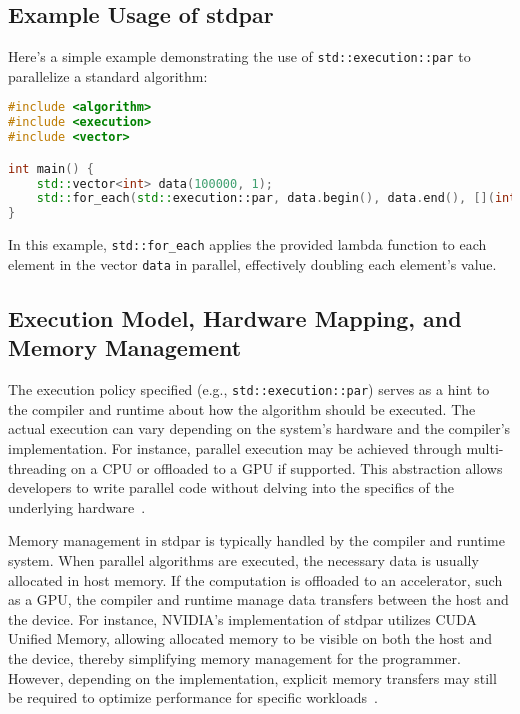 \subsection{Example Usage of stdpar}

Here's a simple example demonstrating the use of \texttt{std::execution::par} to parallelize a standard
algorithm:

\begin{lstlisting}[language=C++, caption={Parallel execution using \texttt{std::execution::par}}]
#include <algorithm>
#include <execution>
#include <vector>

int main() {
    std::vector<int> data(100000, 1);
    std::for_each(std::execution::par, data.begin(), data.end(), [](int& x) { x *= 2; });
}
\end{lstlisting}

In this example, \texttt{std::for\_each} applies the provided lambda function to each element in the vector
\texttt{data} in parallel, effectively doubling each element's value.

\subsection{Execution Model, Hardware Mapping, and Memory Management}

The execution policy specified (e.g., \texttt{std::execution::par}) serves as a hint to the compiler and
runtime about how the algorithm should be executed. The actual execution can vary depending on the system's
hardware and the compiler's implementation. For instance, parallel execution may be achieved through
multi-threading on a CPU or offloaded to a GPU if supported. This abstraction allows developers to write
parallel code without delving into the specifics of the underlying hardware~\cite{V'yukova2018}.

Memory management in stdpar is typically handled by the compiler and runtime system. When parallel algorithms
are executed, the necessary data is usually allocated in host memory. If the computation is offloaded to an
accelerator, such as a GPU, the compiler and runtime manage data transfers between the host and the device.
For instance, NVIDIA's implementation of stdpar utilizes CUDA Unified Memory, allowing allocated memory to be
visible on both the host and the device, thereby simplifying memory management for the programmer. However,
depending on the implementation, explicit memory transfers may still be required to optimize performance for
specific workloads~\cite{NVIDIA2020}.

